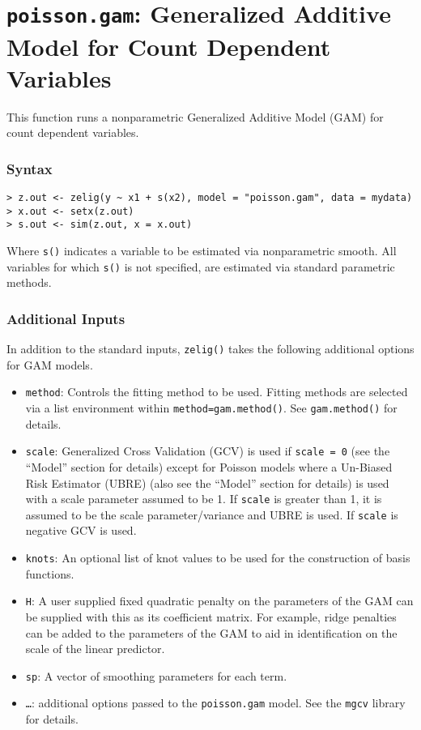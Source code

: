 
\section{{\tt poisson.gam}: Generalized Additive Model for Count Dependent Variables}\label{gam.poisson}

This function runs a nonparametric Generalized Additive Model (GAM) for count dependent variables. 

\subsubsection{Syntax}
\begin{verbatim}
> z.out <- zelig(y ~ x1 + s(x2), model = "poisson.gam", data = mydata) 
> x.out <- setx(z.out)
> s.out <- sim(z.out, x = x.out)
\end{verbatim}
Where {\tt s()} indicates a variable to be estimated via nonparametric smooth. All variables for which  {\tt s()} is not specified, are estimated via standard parametric methods. 

\subsubsection{Additional Inputs}
In addition to the standard inputs, {\tt zelig()} takes the following additional options for GAM models.
\begin{itemize}
\item {\tt method}: Controls the fitting method to be used. Fitting methods are selected via a list environment within {\tt method=gam.method()}. See {\tt gam.method()} for details. 
\item {\tt scale}:  Generalized Cross Validation (GCV) is used if {\tt scale = 0} (see the ``Model'' section for details) except for Poisson models where a Un-Biased Risk Estimator (UBRE) (also see the ``Model'' section for details) is used with a scale parameter assumed to be 1. If {\tt scale} is greater than 1, it is assumed to be the scale parameter/variance and UBRE is used. If {\tt scale} is negative GCV is used.
\item {\tt knots}: An optional list of knot values to be used for the construction of basis functions. 
\item {\tt H}: A user supplied fixed quadratic penalty on the parameters of the GAM can be supplied with this as its coefficient matrix. For example, ridge penalties can be added to the parameters of the GAM to aid in identification on the scale of the linear predictor.
\item {\tt sp}: A vector of smoothing parameters for each term.
\item {\tt \ldots}: additional options passed to the {\tt poisson.gam} model. See the {\tt mgcv} library for details. 
\end{itemize}


